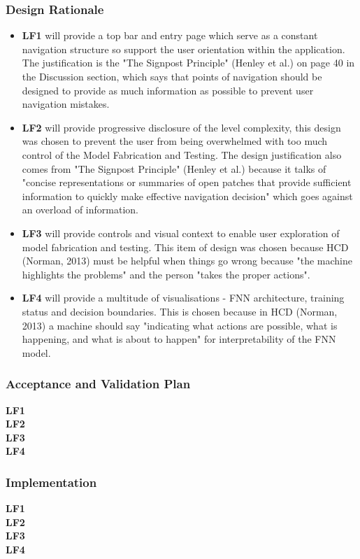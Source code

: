 \documentclass{article}
\begin{document}
\subsubsection{Design Rationale}
\begin{itemize}
    \item \textbf{LF1} will provide a top bar and entry page which serve as a constant navigation structure so support the user orientation within the application. The justification is the "The Signpost Principle" (Henley et al.) on page 40 in the Discussion section, which says that points of navigation should be designed to provide as much information as possible to prevent user navigation mistakes.
    \item \textbf{LF2} will provide progressive disclosure of the level complexity, this design was chosen to prevent the user from being overwhelmed with too much control of the Model Fabrication and Testing. The design justification also comes from "The Signpost Principle" (Henley et al.) because it talks of "concise representations or summaries of open patches that provide sufficient information to quickly make effective navigation decision" which goes against an overload of information.
    \item \textbf{LF3} will provide controls and visual context to enable user exploration of model fabrication and testing. This item of design was chosen because HCD (Norman, 2013) must be helpful when things go wrong because "the machine highlights the problems" and the person "takes the proper actions".
    \item \textbf{LF4} will provide a multitude of visualisations - FNN architecture, training status and decision boundaries. This is chosen because in HCD (Norman, 2013) a machine should say "indicating what actions are possible, what is happening, and what is about to happen" for interpretability of the FNN model.
\end{itemize}

\subsubsection{Acceptance and Validation Plan}
\textbf{LF1} \mbox{} \\
\textbf{LF2} \mbox{} \\
\textbf{LF3} \mbox{} \\
\textbf{LF4} \mbox{} \\

\subsubsection{Implementation}
\textbf{LF1} \mbox{} \\
\textbf{LF2} \mbox{} \\
\textbf{LF3} \mbox{} \\
\textbf{LF4} \mbox{} \\
\end{document}
